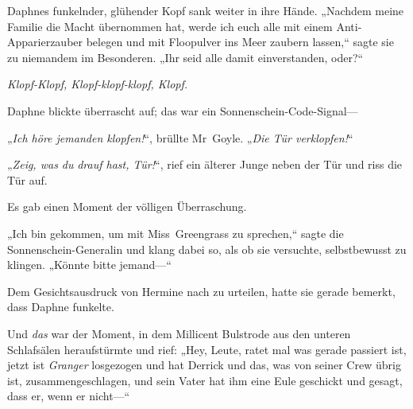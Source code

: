 Daphnes funkelnder, glühender Kopf sank weiter in ihre Hände. „Nachdem meine Familie die Macht übernommen hat, werde ich euch alle mit einem Anti-Apparierzauber belegen und mit Floopulver ins Meer zaubern lassen,“ sagte sie zu niemandem im Besonderen. „Ihr seid alle damit einverstanden, oder?“

\emph{Klopf-Klopf, Klopf-klopf-klopf, Klopf.}

Daphne blickte überrascht auf; das war ein Sonnenschein-Code-Signal—

„\emph{Ich höre jemanden klopfen!}“, brüllte Mr~Goyle. „\emph{Die Tür verklopfen!}“

„\emph{Zeig, was du} \emph{drauf hast, Tür!}“, rief ein älterer Junge neben der Tür und riss die Tür auf.

Es gab einen Moment der völligen Überraschung.

„Ich bin gekommen, um mit Miss~Greengrass zu sprechen,“ sagte die Sonnenschein-Generalin und klang dabei so, als ob sie versuchte, selbstbewusst zu klingen. „Könnte bitte jemand—“

Dem Gesichtsausdruck von Hermine nach zu urteilen, hatte sie gerade bemerkt, dass Daphne funkelte.

Und \emph{das} war der Moment, in dem Millicent Bulstrode aus den unteren Schlafsälen heraufstürmte und rief: „Hey, Leute, ratet mal was gerade passiert ist, jetzt ist \emph{Granger} losgezogen und hat Derrick und das, was von seiner Crew übrig ist, zusammengeschlagen, und sein Vater hat ihm eine Eule geschickt und gesagt, dass er, wenn er nicht—“

